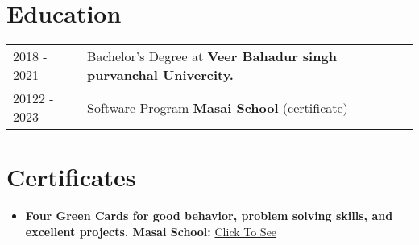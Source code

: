 \documentclass[a4paper,12pt]{article}
\begin{document}

\section{Education}
\begin{tabularx}{\linewidth}{@{}l X@{}}	
2018 - 2021 & Bachelor's Degree at \textbf{Veer Bahadur singh purvanchal Univercity.}
\\
20122 - 2023 & Software Program \textbf{Masai School} \hfill (\href{https://drive.google.com/file/d/1wsvkhC7I2-tUfWS5XmYlv-nv31ak3hNc/view?usp=sharing}{certificate})
\end{tabularx}


\section{Certificates}

\begin{itemize}
    \item \textbf{Four Green Cards for good
behavior, problem solving skills,
and excellent projects.
Masai School:} \href{https://drive.google.com/file/d/1ORk5zNYAmXZU0ORBZDA3VDqyQ5sIhZNK/view}{Click To See}

      
 
\end{itemize}

\vfill
\end{document}
